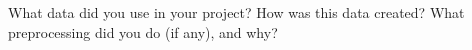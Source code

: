 What data did you use in your project? How was this data created? What
preprocessing did you do (if any), and why?